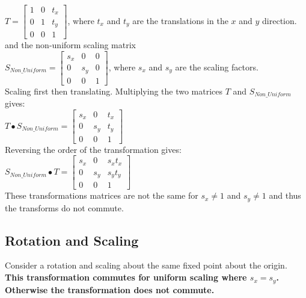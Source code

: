 \documentclass[a4paper,10pt]{scrartcl}
\begin{document}
$T = 
\begin{bmatrix}
    1       & 0 & t_x \\
    0       & 1 & t_y \\
    0       & 0 & 1 
\end{bmatrix}
$, where $t_x $ and $t_y$ are the translations in the $x$ and $y$ direction. \\

and the non-uniform scaling matrix \\

$S_{Non\_Uniform} = \begin{bmatrix}
    s_x       & 0 & 0 \\
    0       & s_y & 0 \\
    0       & 0 & 1     
 \end{bmatrix}
$, where $s_x$ and $s_y$ are the scaling factors. \\

Scaling first then translating. Multiplying the two matrices $T$ and $S_{Non\_Uniform}$ gives: \\

$T \bullet S_{Non\_Uniform} = \begin{bmatrix}
		  s_x & 0 & t_x \\
		  0 & s_y & t_y \\
		  0 & 0 & 1
               \end{bmatrix}
$ \\

Reversing the order of the transformation gives: \\

$S_{Non\_Uniform} \bullet T = \begin{bmatrix}
		  s_x & 0 & s_xt_x \\
		  0 & s_y & s_yt_y \\
		  0 & 0 & 1
               \end{bmatrix}
$ \\ 

These transformations matrices are not the same for $s_x \neq 1$ and $s_y \neq 1$ and thus the transforms do not commute.

\subsection{Rotation and Scaling}

Consider a rotation and scaling about the same fixed point about the origin. {\bfseries This transformation commutes for uniform scaling where $s_x = s_y$. Otherwise the transformation does not commute.}\\
\end{document}

